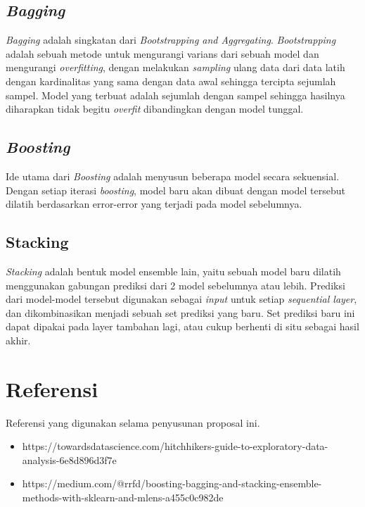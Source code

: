 \documentclass{article}
\begin{document}
\begin{normalsize}
        \subsection{\textit{Bagging}}

        \textit{Bagging} adalah singkatan dari \textit{Bootstrapping and Aggregating}. \textit{Bootstrapping} adalah 
        sebuah metode untuk mengurangi varians dari sebuah model dan mengurangi \textit{overfitting}, dengan melakukan
        \textit{sampling} ulang data dari data latih dengan kardinalitas yang sama dengan data awal sehingga tercipta
        sejumlah sampel. Model yang terbuat adalah sejumlah dengan sampel sehingga hasilnya diharapkan tidak begitu 
        \textit{overfit} dibandingkan dengan model tunggal.

        \subsection{\textit{Boosting}}

        Ide utama dari \textit{Boosting} adalah menyusun beberapa model secara sekuensial. Dengan setiap iterasi 
        \textit{boosting}, model baru akan dibuat dengan model tersebut dilatih berdasarkan error-error yang terjadi
        pada model sebelumnya.

        \subsection{Stacking}

        \textit{Stacking} adalah bentuk model ensemble lain, yaitu sebuah model baru dilatih menggunakan gabungan prediksi
        dari 2 model sebelumnya atau lebih. Prediksi dari model-model tersebut digunakan sebagai \textit{input} untuk 
        setiap \textit{sequential layer}, dan dikombinasikan menjadi sebuah set prediksi yang baru. Set prediksi baru ini 
        dapat dipakai pada layer tambahan lagi, atau cukup berhenti di situ sebagai hasil akhir.

        \section{Referensi}

        Referensi yang digunakan selama penyusunan proposal ini.
        \begin{itemize}
            \item https://towardsdatascience.com/hitchhikers-guide-to-exploratory-data-analysis-6e8d896d3f7e
            \item https://medium.com/@rrfd/boosting-bagging-and-stacking-ensemble-methods-with-sklearn-and-mlens-a455c0c982de
        \end{itemize}
    \end{normalsize}
  
\end{document}
